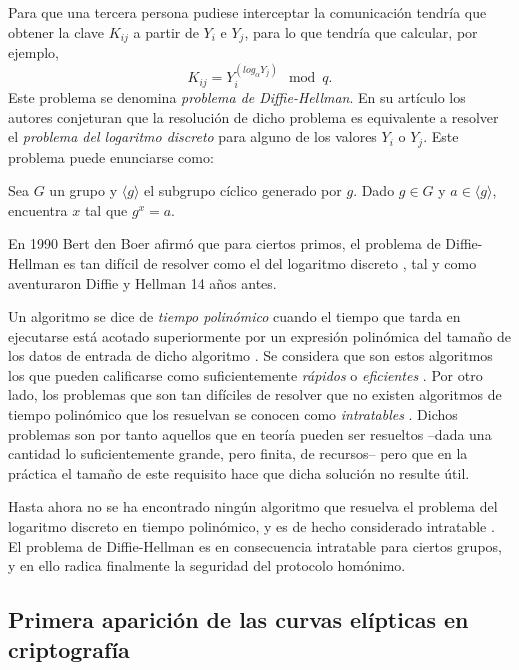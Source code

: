 \documentclass[
  a4paper,
  12pt,
  spanish,
]{scrartcl}
\begin{document}
Para que una tercera persona pudiese interceptar la comunicación tendría que obtener la clave \(K_{ij}\) a partir de \(Y_i\) e \(Y_j\), para lo que tendría que calcular, por ejemplo, \[K_{ij} = Y_i^{\left(log_{\alpha} Y_j\right)} \mod q.\] 
Este problema se denomina \textit{problema de Diffie-Hellman}. 
En su artículo los autores conjeturan que la resolución de dicho problema es equivalente a resolver el \textit{problema del logaritmo discreto} para alguno de los valores \(Y_i\) o \(Y_j\). Este problema puede enunciarse como: \begin{displayquote}
  Sea \(G\) un grupo y \(\langle g \rangle\) el subgrupo cíclico generado por \(g\). Dado \(g \in G\) y \(a \in \langle g \rangle\), encuentra \(x\) tal que \(g^x = a\).
\end{displayquote}
En 1990 Bert den Boer afirmó que para ciertos primos, el problema de Diffie-Hellman es tan difícil de resolver como el del logaritmo discreto \parencite{goos_diffie-hellman_1990}, tal y como aventuraron Diffie y Hellman 14 años antes.

Un algoritmo se dice de \textit{tiempo polinómico} cuando el tiempo que tarda en ejecutarse está acotado superiormente por un expresión polinómica del tamaño de los datos de entrada de dicho algoritmo \parencite[6]{garey_computers_1979}. Se considera que son estos algoritmos los que pueden calificarse como suficientemente \textit{rápidos} o \textit{eficientes} \parencite[33]{goldreich_computational_2008}.
Por otro lado, los problemas que son tan difíciles de resolver que no existen algoritmos de tiempo polinómico que los resuelvan se conocen como \textit{intratables} \parencite[8]{garey_computers_1979}. 
Dichos problemas son por tanto aquellos que en teoría pueden ser resueltos --dada una cantidad lo suficientemente grande, pero finita, de recursos-- pero que en la práctica el tamaño de este requisito hace que dicha solución no resulte útil.

Hasta ahora no se ha encontrado ningún algoritmo que resuelva el problema del logaritmo discreto en tiempo polinómico, y es de hecho considerado intratable \parencite{rueppel_how_1993}.
El problema de Diffie-Hellman es en consecuencia intratable para ciertos grupos, y en ello radica finalmente la seguridad del protocolo homónimo.


\subsection{Primera aparición de las curvas elípticas en criptografía}
\end{document}
